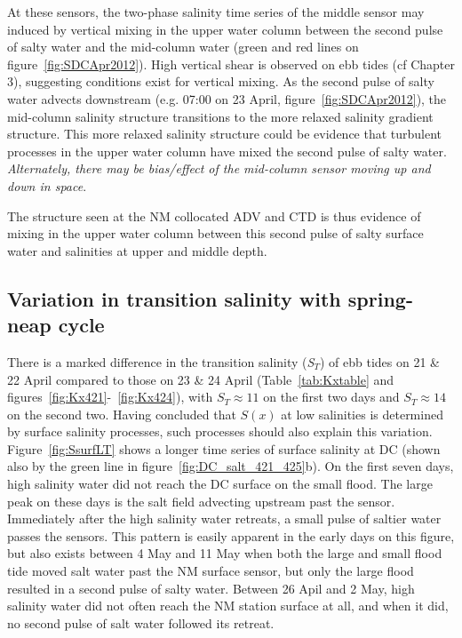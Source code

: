 At these sensors, the two-phase salinity time series of the middle sensor may induced by vertical mixing in the upper water column between the second pulse of salty water and the mid-column water (green and red lines on figure~\ref{fig:SDCApr2012}). High vertical shear is observed on ebb tides (cf Chapter 3), suggesting conditions exist for vertical mixing. As the second pulse of salty water advects downstream (e.g. 07:00 on 23 April, figure~\ref{fig:SDCApr2012}), the mid-column salinity structure transitions to the more relaxed salinity gradient structure. This more relaxed salinity structure could be evidence that turbulent processes in the upper water column have mixed the second pulse of salty water.  \emph{Alternately, there may be bias/effect of the mid-column sensor moving up and down in space}.  

The structure seen at the NM collocated ADV and CTD is thus evidence of mixing in the upper water column between this second pulse of salty surface water and salinities at upper and middle depth.

\subsection{Variation in transition salinity with spring-neap cycle}
There is a marked difference in the transition salinity (\emph{S$_T$}) of ebb tides on 21 \& 22 April compared to those on 23 \& 24 April (Table~\ref{tab:Kxtable} and figures~\ref{fig:Kx421}-~\ref{fig:Kx424}), with $S_T\approx 11$ on the first two days and $S_T\approx 14$ on the second two. Having concluded that $S(x)$ at low salinities is determined by surface salinity processes, such processes should also explain this variation. Figure~\ref{fig:SsurfLT} shows a longer time series of surface salinity at DC (shown also by the green line in figure~\ref{fig:DC_salt_421_425}b). On the first seven days, high salinity water did not reach the DC surface on the small flood. The large peak on these days is the salt field advecting upstream past the sensor. Immediately after the high salinity water retreats, a small pulse of saltier water passes the sensors. This pattern is easily apparent in the early days on this figure, but also exists between 4 May and 11 May when both the large and small flood tide moved salt water past the NM surface sensor, but only the large flood resulted in a second pulse of salty water. Between 26 Apil and 2 May, high salinity water did not often reach the NM station surface at all, and when it did, no second pulse of salt water followed its retreat. 

